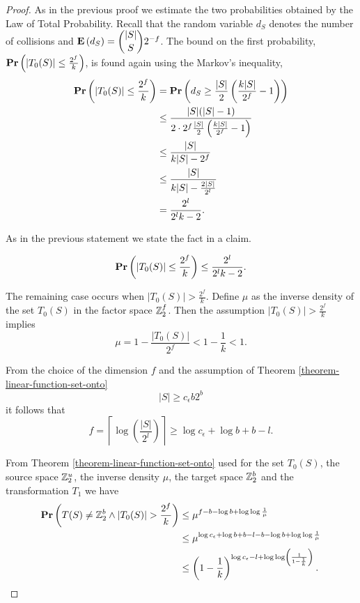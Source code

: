 \begin{proof}
As in the previous proof we estimate the two probabilities obtained by the Law of Total Probability. Recall that the random variable $d_S$ denotes the number of collisions and $\mathbf{E}\left(d_S\right) = \dbinom{|S|}{S}2 ^ {-f}$. The bound on the first probability, $\mathbf{Pr}\left(|T_0(S)| \leq \frac{2 ^ f}{k}\right)$, is found again using the Markov's inequality,
\[
\begin{split}
\mathbf{Pr}\left(|T_0(S)| \leq \frac{2 ^ f}{k}\right) 
	& =  \mathbf{Pr}\left(d_S \geq \frac{|S|}{2} \left( \frac{k|S|}{2 ^ f} - 1 \right)\right) \\
	& \leq \frac{|S|(|S| - 1)}{2 \cdot 2^f \frac{|S|}{2}\left(\frac{k|S|}{2 ^ f} - 1\right)} \\
	& \leq \frac{|S|}{k|S| - 2 ^ f} \\
	& \leq \frac{|S|}{k|S| - \frac{2|S|}{2^l}} \\ 
	& = \frac{2^l}{2^l k - 2} \text{.}
\end{split}
\]

As in the previous statement we state the fact in a claim.
\begin{claim}
\label{claim-better-c-e-probability-1}
\[
\mathbf{Pr}\left(|T_0(S)| \leq \frac{2 ^ f}{k}\right) \leq \frac{2^l}{2^l k - 2} \text{.}
\]
\end{claim}

The remaining case occurs when $|T_0(S)| > \frac {2 ^ f}{k}$. Define $\mu$ as the inverse density of the set $T_0(S)$ in the factor space $\mathbb{Z}_{2}^{f}$. Then the assumption $|T_0(S)| > \frac {2 ^ f}{k}$ implies
\[
	\mu = 1 - \frac{|T_0(S)|}{2 ^ f} < 1 - \frac{1}{k} < 1 \text{.}
\]

From the choice of the dimension $f$ and the assumption of Theorem \ref{theorem-linear-function-set-onto} \[ |S| \geq c_\epsilon b 2 ^ b \] it follows that
\[
	f = \left\lceil \log \left( \frac{|S|}{2 ^ l} \right) \right\rceil \geq \log c_\epsilon + \log b  + b - l \text{.}
\]

From Theorem \ref{theorem-linear-function-set-onto} used for the set $T_0(S)$, the source space $\mathbb{Z}_{2}^{u}$, the inverse density $\mu$, the target space $\mathbb{Z}_{2}^{b}$ and the transformation $T_1$ we have 
\[
\begin{split}
\mathbf{Pr}\left(T(S) \neq \mathbb{Z}_{2}^{b} \wedge |T_0(S)| > \frac {2 ^ f}{k}\right) 
	& \leq \mu ^ {f - b - \log b + \log \log \frac{1}{\mu}} \\ 
	& \leq \mu ^ {\log c_\epsilon + \log b + b - l - b - \log b + \log \log \frac{1}{\mu}} \\ 
	& \leq \left(1 - \frac{1}{k}\right) ^ {\log c_\epsilon - l + \log \log \left(\frac{1}{1 - \frac{1}{k}} \right)} \text{.}
\end{split}
\]


\end{proof}
